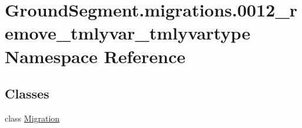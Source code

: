 \hypertarget{namespace_ground_segment_1_1migrations_1_10012__remove__tmlyvar__tmlyvartype}{}\section{Ground\+Segment.\+migrations.0012\+\_\+remove\+\_\+tmlyvar\+\_\+tmlyvartype Namespace Reference}
\label{namespace_ground_segment_1_1migrations_1_10012__remove__tmlyvar__tmlyvartype}
\subsection*{Classes}
\begin{DoxyCompactItemize}
\item 
class \hyperlink{class_ground_segment_1_1migrations_1_10012__remove__tmlyvar__tmlyvartype_1_1_migration}{Migration}
\end{DoxyCompactItemize}
